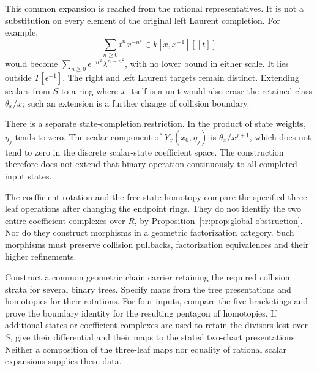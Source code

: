 This common expansion is reached from the rational representatives.
It is not a substitution on every element of the original left
Laurent completion.  For example,
\[
 \sum_{n\ge0}t^n x^{-n^2}
 \in k[x,x^{-1}][[t]]
\]
would become
\(\sum_{n\ge0}\epsilon^{-n^2}\lambda^{n-n^2}\),
with no lower bound in either scale.  It lies outside
\(T[\epsilon^{-1}]\).  The right and left Laurent targets
remain distinct.  Extending scalars from \(S\) to a ring
where \(x\) itself is a unit would also erase the retained
class \(\theta_x/x\); such an extension is a further change
of collision boundary.

There is a separate state-completion restriction.  In the product
of state weights, \(\eta_j\) tends to zero.  The scalar
component of \(Y_x(x_0,\eta_j)\) is
\(\theta_x/x^{j+1}\), which does not tend to zero in the
discrete scalar-state coefficient space.  The construction therefore
does not extend that binary operation continuously to all completed
input states.

The coefficient rotation and the free-state homotopy compare the
specified three-leaf operations after changing the endpoint rings.
They do not identify the two entire coefficient complexes over
\(R\), by Proposition~\ref{tr:prop:global-obstruction}.
Nor do they construct morphisms in a geometric factorization
category.  Such morphisms must preserve collision pullbacks,
factorization equivalences and their higher refinements.

\begin{problem}
Construct a common geometric chain carrier retaining the required
collision strata for several binary trees.  Specify maps from the
tree presentations and homotopies for their rotations.  For four
inputs, compare the five bracketings and prove the boundary identity
for the resulting pentagon of homotopies.  If additional states or
coefficient complexes are used to retain the divisors lost over
\(S\), give their differential and their maps to the stated
two-chart presentations.  Neither a composition of the three-leaf
maps nor equality of rational scalar expansions supplies these data.
\end{problem}
